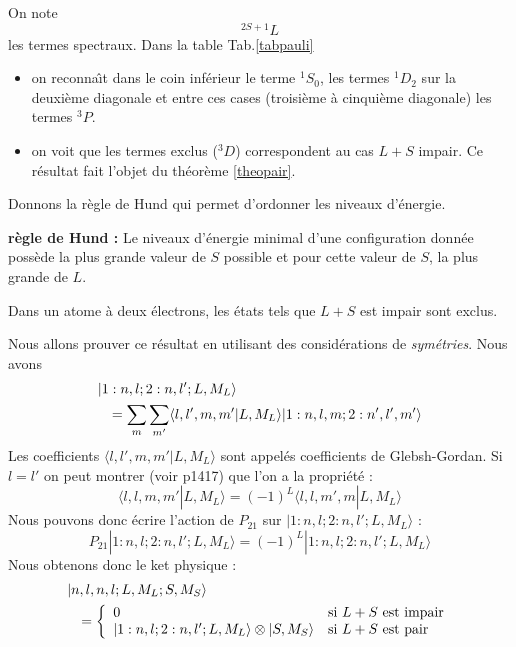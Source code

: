 \documentclass[12pt]{book}
\begin{document}
\begin{exmp}
\begin{table}[hbt]
\begin{center}
\end{center}
\end{table}
On note  
\begin{equation}
^{2S+1}L
\end{equation}
les termes spectraux. Dans la table Tab.\ref{tabpauli}
\begin{itemize}
\item on reconna\^\i t dans le coin inf\'erieur le terme $^1S_0$, les
termes $^1D_2$ sur la deuxi\`eme diagonale et entre ces cases (troisi\`eme
\`a cinqui\`eme diagonale) les termes  $^3P$.
\item  on voit que les termes exclus ($^3D$) correspondent au cas
$L+S$ impair. Ce r\'esultat fait l'objet du th\'eor\`eme \ref{theopair}.
\end{itemize}
Donnons la r\`egle de Hund qui permet d'ordonner les niveaux d'\'energie.
\begin{postulat}
{\bf r\`egle de Hund :} Le niveaux d'\'energie minimal d'une configuration
donn\'ee poss\`ede la plus grande valeur de $S$ possible et pour cette
valeur de $S$, la plus grande de $L$.
\end{postulat}   
\end{exmp}

\begin{thm}\label{theopair}
Dans un atome \`a deux \'electrons, les \'etats tels que $L+S$ est
impair sont exclus.
\end{thm}
\begin{pf}
Nous allons prouver ce r\'esultat en utilisant des consid\'erations de
{\it sym\'etries}. Nous avons
\begin{eqnarray}
\lefteqn{|1:n,l;2:n,l';L,M_L\rangle } \nonumber\\
& &=\sum_m \sum_{m'}  \langle l,l',m,m'|L,M_L\rangle
|1:n,l,m;2:n',l',m'\rangle  
\end{eqnarray}
Les coefficients $  \langle l,l',m,m'|L,M_L\rangle $ sont appel\'es
coefficients de 
Glebsh-Gordan. Si $l=l'$ on peut montrer (voir \cite{ph:mecaq:Cohen73} p1417) que
l'on a la propri\'et\'e :
\begin{equation}
  \langle l,l,m,m'|L,M_L\rangle =(-1)^L \langle l,l,m',m|L,M_L\rangle 
\end{equation}
Nous pouvons donc \'ecrire l'action de $P_{21}$ sur
$|1:n,l;2:n,l';L,M_L\rangle $ :
\begin{equation}
P_{21}|1:n,l;2:n,l';L,M_L\rangle =(-1)^L|1:n,l;2:n,l';L,M_L\rangle 
\end{equation}
Nous obtenons donc le ket physique :
\begin{eqnarray}
\lefteqn{|n,l,n,l;L,M_L;S,M_S\rangle }\nonumber\\
& &= \left\{
\begin{array}{ll}
0&{\rm si\ }L+S{\rm\ est\ impair}\\
|1:n,l;2:n,l';L,M_L\rangle \otimes |S,M_S\rangle &{\rm si\ }L+S{\rm\
est\ pair}
\end{array} 
\right.
\end{eqnarray}
\end{pf}
\end{document}
